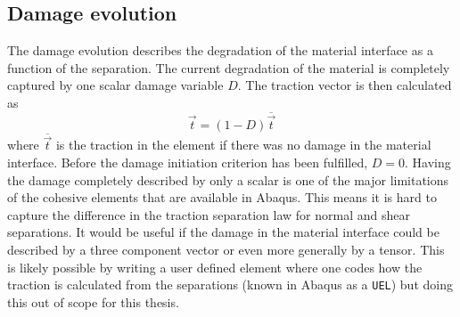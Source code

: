 \documentclass[grain_boundary_law.tex]{subfiles}
\begin{document}
\subsection{Damage evolution}
\label{sec:dmg_evo}

The damage evolution describes the degradation of the material interface as a function of the separation. The current degradation of the material is completely captured by one scalar damage variable $D$. The traction vector is then calculated as 
%
\[ \vec{t} = (1 - D) \overline{\vec{t}} \]
%
 where $\overline{\vec{t}}$ is the traction in the element if there was no damage in the material interface. Before the damage initiation criterion has been fulfilled, $D = 0$. Having the damage completely described by only a scalar is one of the major limitations of the cohesive elements that are available in Abaqus. This means it is hard to capture the difference in the traction separation law for normal and shear separations. It would be useful if the damage in the material interface could be described by a three component vector or even more generally by a tensor. This is likely possible by writing a user defined element where one codes how the traction is calculated from the separations (known in Abaqus as a \texttt{UEL}) but doing this out of scope for this thesis.
\end{document}
